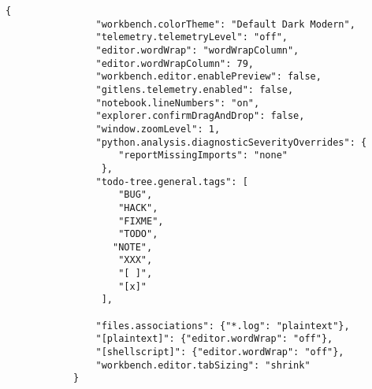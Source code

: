\documentclass[12pt, a4paper]{scrbook}
\numberwithin{equation}{section}
\theoremstyle{definition}
\theoremstyle{definition}
\begin{document}
		\begin{lstlisting}[style=mystylebash, label=alg:vscode__settings_file, xleftmargin=\parindent]
			{
				"workbench.colorTheme": "Default Dark Modern",
				"telemetry.telemetryLevel": "off",
				"editor.wordWrap": "wordWrapColumn",
				"editor.wordWrapColumn": 79,
				"workbench.editor.enablePreview": false,
				"gitlens.telemetry.enabled": false,
				"notebook.lineNumbers": "on",
				"explorer.confirmDragAndDrop": false,
				"window.zoomLevel": 1, 
				"python.analysis.diagnosticSeverityOverrides": {
				    "reportMissingImports": "none"
				 }, 
			 	"todo-tree.general.tags": [
				    "BUG",
				    "HACK",
				    "FIXME",
				    "TODO",
			 	   "NOTE",
				    "XXX",
				    "[ ]",
				    "[x]"
				 ],

				"files.associations": {"*.log": "plaintext"},
				"[plaintext]": {"editor.wordWrap": "off"}, 
				"[shellscript]": {"editor.wordWrap": "off"},
				"workbench.editor.tabSizing": "shrink"
			}
		\end{lstlisting}
	
\end{document}

